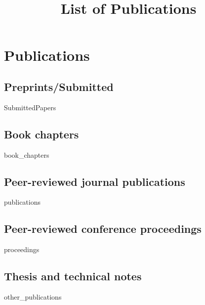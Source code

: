\documentclass[12pt]{scrartcl}
\title{List of Publications}
\begin{document}
\maketitle
\nocite{*}


\section{Publications}


\subsection{\textbf{Preprints/Submitted}}
\begin{btSect}[unsrt]{SubmittedPapers}
\btPrintAll
\end{btSect}

\subsection{Book chapters}
\begin{btSect}[unsrt]{book_chapters}
\btPrintAll
\end{btSect}

\subsection{\textbf{Peer-reviewed journal publications}}

\begin{btSect}{publications}
\btPrintAll
\end{btSect}

\subsection{\textbf{Peer-reviewed conference proceedings}}
\begin{btSect}[unsrt]{proceedings}
\btPrintAll
\end{btSect}




\subsection{\textbf{Thesis and technical notes}}
\begin{btSect}[unsrt]{other_publications}
	\btPrintAll
\end{btSect}
\end{document}

